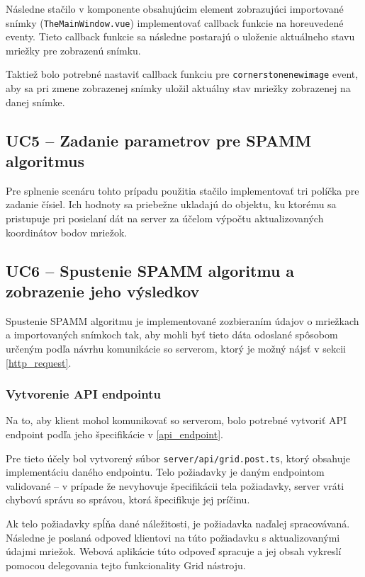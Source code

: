 Následne stačilo v komponente obsahujúcim element zobrazujúci importované snímky (\texttt{TheMainWindow.vue}) implementovať callback funkcie na horeuvedené eventy. Tieto callback funkcie sa následne postarajú o uloženie aktuálneho stavu mriežky pre zobrazenú snímku. 

Taktiež bolo potrebné nastaviť callback funkciu pre \texttt{cornerstonenewimage} event, aby sa pri zmene zobrazenej snímky uložil aktuálny stav mriežky zobrazenej na danej snímke.

\subsection {UC5 -- Zadanie parametrov pre SPAMM algoritmus}
Pre splnenie scenáru tohto prípadu použitia stačilo implementovať tri políčka pre zadanie čísiel. Ich hodnoty sa priebežne ukladajú do objektu, ku ktorému sa pristupuje pri posielaní dát na server za účelom výpočtu aktualizovaných koordinátov bodov mriežok.

\subsection {UC6 -- Spustenie SPAMM algoritmu a zobrazenie jeho výsledkov}
Spustenie SPAMM algoritmu je implementované zozbieraním údajov o mriežkach a importovaných snímkoch tak, aby mohli byť tieto dáta odoslané spôsobom určeným podľa návrhu komunikácie so serverom, ktorý je možný nájsť v sekcii \ref{http_request}.

\subsubsection {Vytvorenie API endpointu}
Na to, aby klient mohol komunikovať so serverom, bolo potrebné vytvoriť API endpoint podľa jeho špecifikácie v \ref{api_endpoint}.

Pre tieto účely bol vytvorený súbor \texttt{server/api/grid.post.ts}, ktorý obsahuje implementáciu daného endpointu. Telo požiadavky je daným endpointom validované --  v prípade že nevyhovuje špecifikácii tela požiadavky, server vráti chybovú správu so správou, ktorá špecifikuje jej príčinu.

Ak telo požiadavky spĺňa dané náležitosti, je požiadavka naďalej spracovávaná. Následne je poslaná odpoveď klientovi na túto požiadavku s aktualizovanými údajmi mriežok. Webová aplikácie túto odpoveď spracuje a jej obsah vykreslí pomocou delegovania tejto funkcionality Grid nástroju.

